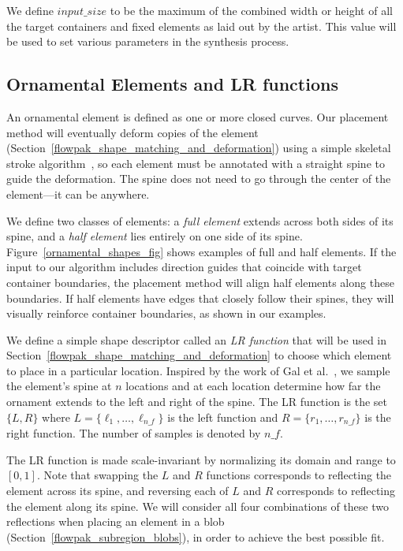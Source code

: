 We define $input\_size$ to be the maximum of the combined width or height
of all the target containers and fixed elements as laid out by the artist.
This value will
be used to set various parameters in the synthesis process.

\subsection{Ornamental Elements and LR functions}
\label{flowpak_ornamental_element_and_lr_functions}

An ornamental element is defined as one or more closed curves.  Our placement method will
eventually deform copies of the element (Section~\ref{flowpak_shape_matching_and_deformation}) 
using a simple skeletal stroke algorithm~\cite{Hsu1993},
so each element must be annotated with a straight spine to guide the deformation.  The spine
does not need to go through the center of the element---it can be anywhere.

We define two classes of elements: a \textit{full element} extends across
both sides of its
spine, and a \textit{half element} lies entirely on one side of its spine.
Figure~\ref{ornamental_shapes_fig} shows examples of full and half elements.  If the input
to our algorithm includes direction guides that coincide with target container boundaries,
the placement method will align half elements along these boundaries.  
If half elements 
have edges that closely follow their spines, they will visually reinforce
container boundaries, as shown in our examples.

We define a simple shape descriptor called an \textit{LR function}
that will be used in
Section~\ref{flowpak_shape_matching_and_deformation} to choose which element to place in a particular location. 
Inspired by the work of Gal et al.~\cite{Gal2007A}, we sample the element's
spine at $n$ locations and at each location determine how far the ornament extends to the
left and right of the spine. The LR function is the set $\{L, R\}$ where $L=\{\ell_1,\ldots,\ell_{n\text{\_}f}\}$
is the left function and $R=\{r_1,\ldots,r_{n\text{\_}f}\}$ is the right function. The number of samples is denoted by $n\text{\_}f$.

The LR function is made scale-invariant by normalizing its
domain and range to $[0,1]$.  Note that swapping the $L$ and $R$ functions
corresponds to reflecting the element across its spine, and reversing each
of $L$ and $R$ corresponds to reflecting the element along its spine.  We
will consider all four combinations of these two reflections when placing 
an element in a blob (Section~\ref{flowpak_subregion_blobs}),
in order to achieve the best possible fit.

